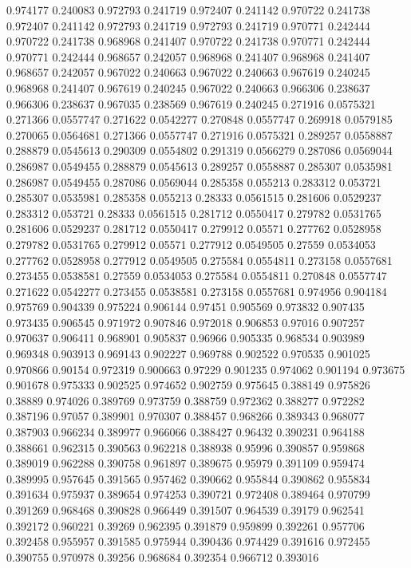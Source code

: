 0.974177 0.240083
0.972793 0.241719
0.972407 0.241142
0.970722 0.241738
0.972407 0.241142
0.972793 0.241719
0.972793 0.241719
0.970771 0.242444
0.970722 0.241738
0.968968 0.241407
0.970722 0.241738
0.970771 0.242444
0.970771 0.242444
0.968657 0.242057
0.968968 0.241407
0.968968 0.241407
0.968657 0.242057
0.967022 0.240663
0.967022 0.240663
0.967619 0.240245
0.968968 0.241407
0.967619 0.240245
0.967022 0.240663
0.966306 0.238637
0.966306 0.238637
0.967035 0.238569
0.967619 0.240245
0.271916 0.0575321
0.271366 0.0557747
0.271622 0.0542277
0.270848 0.0557747
0.269918 0.0579185
0.270065 0.0564681
0.271366 0.0557747
0.271916 0.0575321
0.289257 0.0558887
0.288879 0.0545613
0.290309 0.0554802
0.291319 0.0566279
0.287086 0.0569044
0.286987 0.0549455
0.288879 0.0545613
0.289257 0.0558887
0.285307 0.0535981
0.286987 0.0549455
0.287086 0.0569044
0.285358 0.055213
0.283312 0.053721
0.285307 0.0535981
0.285358 0.055213
0.28333 0.0561515
0.281606 0.0529237
0.283312 0.053721
0.28333 0.0561515
0.281712 0.0550417
0.279782 0.0531765
0.281606 0.0529237
0.281712 0.0550417
0.279912 0.05571
0.277762 0.0528958
0.279782 0.0531765
0.279912 0.05571
0.277912 0.0549505
0.27559 0.0534053
0.277762 0.0528958
0.277912 0.0549505
0.275584 0.0554811
0.273158 0.0557681
0.273455 0.0538581
0.27559 0.0534053
0.275584 0.0554811
0.270848 0.0557747
0.271622 0.0542277
0.273455 0.0538581
0.273158 0.0557681
0.974956 0.904184
0.975769 0.904339
0.975224 0.906144
0.97451 0.905569
0.973832 0.907435
0.973435 0.906545
0.971972 0.907846
0.972018 0.906853
0.97016 0.907257
0.970637 0.906411
0.968901 0.905837
0.96966 0.905335
0.968534 0.903989
0.969348 0.903913
0.969143 0.902227
0.969788 0.902522
0.970535 0.901025
0.970866 0.90154
0.972319 0.900663
0.97229 0.901235
0.974062 0.901194
0.973675 0.901678
0.975333 0.902525
0.974652 0.902759
0.975645 0.388149
0.975826 0.38889
0.974026 0.389769
0.973759 0.388759
0.972362 0.388277
0.972282 0.387196
0.97057 0.389901
0.970307 0.388457
0.968266 0.389343
0.968077 0.387903
0.966234 0.389977
0.966066 0.388427
0.96432 0.390231
0.964188 0.388661
0.962315 0.390563
0.962218 0.388938
0.95996 0.390857
0.959868 0.389019
0.962288 0.390758
0.961897 0.389675
0.95979 0.391109
0.959474 0.389995
0.957645 0.391565
0.957462 0.390662
0.955844 0.390862
0.955834 0.391634
0.975937 0.389654
0.974253 0.390721
0.972408 0.389464
0.970799 0.391269
0.968468 0.390828
0.966449 0.391507
0.964539 0.39179
0.962541 0.392172
0.960221 0.39269
0.962395 0.391879
0.959899 0.392261
0.957706 0.392458
0.955957 0.391585
0.975944 0.390436
0.974429 0.391616
0.972455 0.390755
0.970978 0.39256
0.968684 0.392354
0.966712 0.393016
